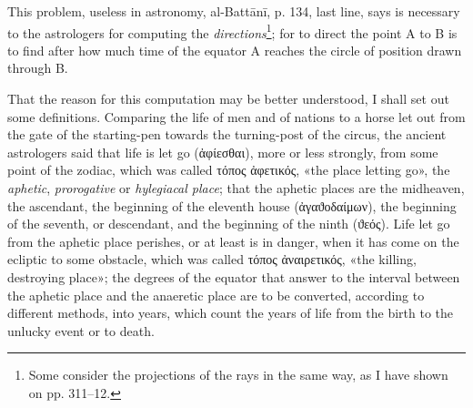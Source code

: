 \documentclass[11pt]{article}
\begin{document}
\par This problem, useless in astronomy, al-Battānī, p. 134, last line, says is necessary to the astrologers for computing the \emph{directions}\footnote{Some consider the projections of the rays in the same way, as I have shown on pp. 311–12.}; for to direct the point A to B is to find after how much time of the equator A reaches the circle of position drawn through B.\par
\par That the reason for this computation may be better understood, I shall set out some definitions. Comparing the life of men and of nations to a horse let out from the gate of the starting-pen towards the turning-post of the circus, the ancient astrologers said that life is let go ({\greekfont ἀφίεσθαι}), more or less strongly, from some point of the zodiac, which was called {\greekfont τόπος ἀφετικός}, «the place letting go», the \emph{aphetic}, \emph{prorogative} or \emph{hylegiacal place}; that the aphetic places are the midheaven, the ascendant, the beginning of the eleventh house ({\greekfont ἀγαϑοδαίμων}), the beginning of the seventh, or descendant, and the beginning of the ninth ({\greekfont ϑεός}). Life let go from the aphetic place perishes, or at least is in danger, when it has come on the ecliptic to some obstacle, which was called {\greekfont τόπος ἀναιρετικός}, «the killing, destroying place»; the degrees of the equator that answer to the interval between the aphetic place and the anaeretic place are to be converted, according to different methods, into years, which count the years of life from the birth to the unlucky event or to death.\par
\end{document}

